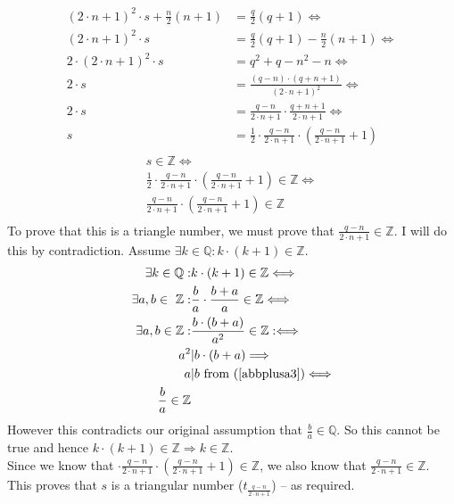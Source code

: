 \documentclass[10pt,\jkfside,a4paper]{article}
\begin{document}
\begin{enumerate}
\begin{equation}
\begin{split}
(2\cdot n + 1)^2\cdot s + \frac{n}{2}(n + 1) &= \frac{q}{2}(q + 1) \Longleftrightarrow\\
(2\cdot n + 1)^2\cdot s &= \frac{q}{2}(q + 1) - \frac{n}{2}(n + 1) \Longleftrightarrow\\
2 \cdot (2\cdot n + 1)^2\cdot s &= q^2 + q - n^2 - n \Longleftrightarrow\\
2\cdot s &= \frac{(q - n)\cdot(q + n + 1)}{(2\cdot n + 1)^2}\Longleftrightarrow\\
2\cdot s &= \frac{q - n}{2\cdot n + 1} \cdot \frac{q + n + 1}{2 \cdot n + 1}\Longleftrightarrow\\
s &= \frac{1}{2}\cdot\frac{q - n}{2\cdot n + 1}\cdot\left(\frac{q - n}{2\cdot n + 1} + 1\right)\\
\end{split}
\end{equation}
\begin{equation}
\begin{split}
s \in \mathbb{Z}\Longleftrightarrow\\
\frac{1}{2}\cdot\frac{q - n}{2\cdot n + 1}\cdot\left(\frac{q - n}{2\cdot n + 1} + 1\right)\in \mathbb{Z} \Longleftrightarrow\\
\frac{q - n}{2\cdot n + 1}\cdot\left(\frac{q - n}{2\cdot n + 1} + 1\right)\in \mathbb{Z}\\
\end{split}
\end{equation}
To prove that this is a triangle number, we must prove that $\frac{q - n}{2\cdot n + 1} \in \mathbb{Z}$. 
I will do this by contradiction. Assume $\exists k \in \mathbb{Q}: k\cdot (k + 1) \in \mathbb{Z}$.
\begin{equation}
\begin{split}
\exists k \in \mathbb{Q}: &k\cdot(k + 1) \in \mathbb{Z} \Longleftrightarrow\\
\exists a, b \in\ \mathbb{Z}: &\frac{b}{a}\cdot \frac{b + a}{a} \in \mathbb{Z}\Longleftrightarrow\\
\exists a, b \in \mathbb{Z}: &\frac{b\cdot (b + a)}{a^2} \in \mathbb{Z}:\Longleftrightarrow\\
a^2 &| b\cdot(b + a)\Longrightarrow\\
a &| b \text{ from (\ref{abbplusa3})}\Longleftrightarrow\\
\frac{b}{a} \in \mathbb{Z}\\
\end{split}
\end{equation}
However this contradicts our original assumption that $\frac{b}{a}\in \mathbb{Q}$. So this cannot be 
true and hence $k\cdot (k + 1) \in \mathbb{Z} \Longrightarrow k \in \mathbb{Z}$.\\
Since we know that $\cdot\frac{q - n}{2\cdot n + 1}\cdot\left(\frac{q - n}{2\cdot n + 1} + 1\right) \in \mathbb{Z}$, 
we also know that $\frac{q - n}{2\cdot n + 1} \in \mathbb{Z}$.\\
This proves that $s$ is a triangular number ($t_{\frac{q - n}{2\cdot n + 1}}$) -- as required.


\end{enumerate}
\end{document}
